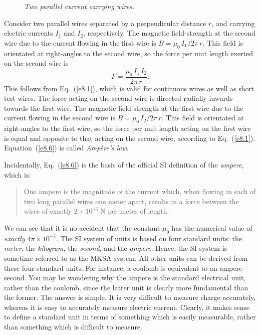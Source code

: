 \begin{figure}[h]
\epsfysize=2.5in
\centerline{}
\caption{\em Two parallel current carrying wires.}
\end{figure}

Consider two parallel wires separated by a perpendicular distance $r$,
and carrying electric currents $I_1$ and $I_2$, respectively. The magnetic field-strength at the second wire due to the current flowing in the first wire 
is $B = \mu_0 \,I_1/2\pi\, r$. This field is orientated at right-angles to the second
wire, so the force per unit length exerted on the second wire is
\begin{equation}\label{e8.6}
F= \frac{\mu_0\, I_1 \,I_2}{2\pi\, r}.
\end{equation}
This follows from Eq.~(\ref{e8.1}), which is valid for continuous wires as well as short
test wires. The force acting on the second wire is directed radially inwards towards
the first wire. The magnetic field-strength at the first wire due to the
current flowing in the second wire is $B= \mu_0 \,I_2/2\pi\, r$. This field
is orientated at right-angles to the first wire, so the force per unit length acting
on the first wire is equal and opposite to that acting on the second wire, 
according to Eq.~(\ref{e8.1}).  Equation~(\ref{e8.6}) is called {\em Amp\`{e}re's law}.

Incidentally, Eq.~(\ref{e8.6}) is the basis of the official SI definition of the
{\em ampere}, which is:
\begin{quote}
{\sf One ampere is the magnitude of the current which, when flowing in
each of two long parallel wires one meter apart, results in a force 
between the wires of exactly $2\times 10^{-7}$\,N per meter of length.}
\end{quote}
We can see that it is no accident that the constant $\mu_0$ has the
numerical value of {\em exactly} $4\pi\times 10^{-7}$. 
The SI system of units is based on four standard units: the {\em meter},
the {\em kilogram}, the {\em second}, and the {\em ampere}. Hence, the SI system is
sometime referred to as the MKSA system. All other units can be derived
from these four standard units. For instance, a coulomb is equivalent to
an ampere-second. You may be wondering why the ampere is the standard
electrical unit, rather than the coulomb, since the latter unit is
clearly more fundamental than the former. The answer is simple. It is very difficult
to measure charge accurately, whereas it is easy to accurately measure electric
current. Clearly, it makes  sense to define a standard unit in terms
of something which is easily measurable, rather than something which is
difficult to measure.

